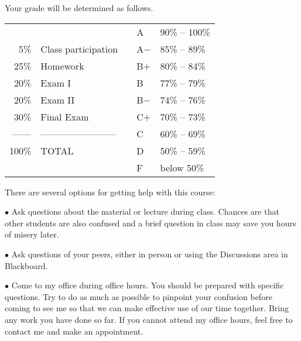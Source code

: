 \documentclass[11pt]{article}
\begin{document}
Your grade will be determined as follows. 

\medskip


\begin{tabular}{rlp{4cm}ll}
& & & A & 90\% -- 100\%\\
5\% & Class participation & & A$-$ & 85\% -- 89\%\\
25\% & Homework & & B$+$ & 80\% -- 84\%\\
20\% &  Exam I & & B & 77\% -- 79\%\\ 
20\% & Exam II & & B$-$ & 74\% -- 76\%\\
30\% & Final Exam  & & C$+$ & 70\% -- 73\%\\
------ & ------------------------ & & C & 60\% -- 69\%\\
100\% & TOTAL  & & D & 50\% -- 59\%\\ 
& & & F & below 50\%
\end{tabular}

\bigskip


There are several options for getting help with this course:

$\bullet$ Ask questions about the material or lecture during
class. Chances are that other students are also confused and a brief
question in class may save you hours of misery later.
  
$\bullet$ Ask questions of your peers, either in person or using the
Discussions area in Blackboard. 


$\bullet$ Come to my office during office hours. You should be
prepared with specific questions. Try to do as much as possible to
pinpoint your confusion before coming to see me so that we can make
effective use of our time together. Bring any work you have done so
far. If you cannot attend my office hours, feel free to contact me and
make an appointment.

  
\end{document}
